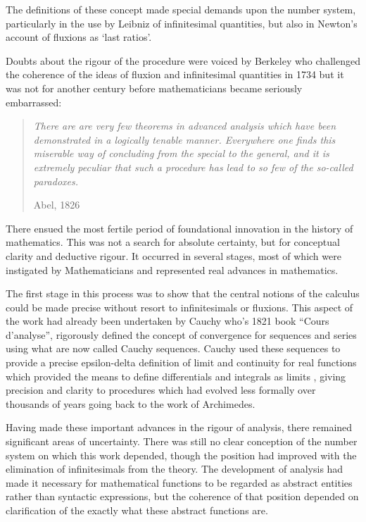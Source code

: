 \documentclass[10pt,titlepage]{book}
\begin{document}
The definitions of these concept made special demands upon the number system, particularly in the use by Leibniz of infinitesimal quantities, but also in Newton's account of fluxions as `last ratios'.

Doubts about the rigour of the procedure were voiced by Berkeley
who challenged the coherence of the ideas of fluxion and infinitesimal quantities\cite{berkeley2018analyst} in 1734 but it was not for another century before mathematicians became seriously embarrassed:

\begin{quotation}
  \emph{There are are very few theorems in advanced analysis which have been demonstrated in a logically tenable manner. Everywhere one finds this miserable way of concluding from the special to the general, and it is extremely peculiar that such a procedure has lead to so few of the so-called paradoxes.}

Abel, 1826
\end{quotation}

There ensued the most fertile period of foundational innovation in the history of mathematics.
This was not a search for absolute certainty, but for conceptual clarity and deductive rigour.
It occurred in several stages, most of which were instigated by Mathematicians and represented real advances in mathematics.

The first stage in this process was to show that the central notions of the calculus could be made precise without resort to infinitesimals or fluxions.
This aspect of the work had already been undertaken by Cauchy who's 1821 book ``Cours d'analyse''\cite{bradley2010cauchy}, rigorously defined the concept of convergence for sequences and series using what are now called Cauchy sequences.
Cauchy used these sequences to provide a precise epsilon-delta definition of limit and continuity for real functions which provided the means to  define differentials and integrals as limits \cite{cates2019cauchy}, giving precision and clarity to procedures which had evolved less formally over thousands of years going back to the work of Archimedes.

Having made these important advances in the rigour of analysis, there remained significant areas of uncertainty.
There was still no clear conception of the number system on which this work depended, though the position had improved with the elimination of infinitesimals from the theory.
The development of analysis had made it necessary for mathematical functions to be regarded as abstract entities rather than syntactic expressions, but the coherence of that position depended on clarification of the exactly what these abstract functions are.
\end{document}
